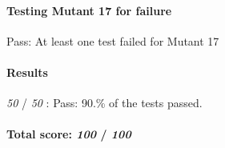 \paragraph*{Testing Mutant 17 for failure}


\begin{DoxyItemize}
\item Pass\+: At least one test failed for Mutant 17
\end{DoxyItemize}

\paragraph*{Results}


\begin{DoxyItemize}
\item {\itshape 50} / {\itshape 50} \+: Pass\+: 90.\% of the tests passed.
\end{DoxyItemize}

\paragraph*{Total score\+: {\itshape 100} / {\itshape 100}}